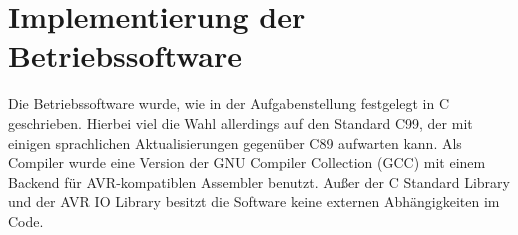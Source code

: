 \chapter{Implementierung der Betriebssoftware}
Die Betriebssoftware wurde, wie in der Aufgabenstellung festgelegt in C geschrieben.
Hierbei viel die Wahl allerdings auf den Standard C99, der mit einigen sprachlichen
Aktualisierungen gegenüber C89 aufwarten kann. Als Compiler wurde eine Version der
GNU Compiler Collection (GCC) mit einem Backend für AVR-kompatiblen Assembler benutzt.
Außer der C Standard Library und der AVR IO Library besitzt die Software keine externen
Abhängigkeiten im Code.
